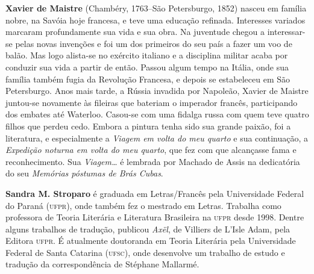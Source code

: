 \textbf{Xavier de Maistre} (Chambéry, 1763--São Petersburgo, 1852)
nasceu em família nobre, na Savóia hoje francesa, e teve uma educação
refinada. Interesses variados marcaram profundamente sua vida e
sua obra. Na juventude chegou a interessar-se pelas novas invenções e
foi um dos primeiros do seu país a fazer um voo de balão. Mas logo
alista-se no exército italiano e a disciplina militar acaba por
conduzir sua vida a partir de então. Passou algum tempo na Itália, onde
sua família também fugia da Revolução Francesa, e depois se estabeleceu
em São Petersburgo. Anos mais tarde, a Rússia invadida por Napoleão,
Xavier de Maistre juntou-se novamente às fileiras que bateriam o
imperador francês, participando dos embates até Waterloo. Casou-se com
uma fidalga russa com quem teve quatro filhos que perdeu cedo. Embora a
pintura tenha sido sua grande paixão, foi a literatura, e especialmente
a \textit{Viagem em volta do meu quarto} e sua continuação, a
\textit{Expedição noturna em volta do meu quarto}, que fez com que
alcançasse fama e reconhecimento. Sua \textit{Viagem\ldots} é lembrada por
Machado de Assis na dedicatória do seu \textit{Memórias póstumas de Brás Cubas}.   

\textbf{Sandra M. Stroparo} é graduada em Letras/Francês pela Universidade
Federal do Paraná (\textsc{ufpr}), onde também fez o mestrado em Letras.
Trabalha como professora de Teoria Literária e Literatura Brasileira na
\textsc{ufpr} desde 1998. Dentre alguns trabalhos de tradução, publicou
\textit{Axël}, de Villiers de L’Isle Adam, pela Editora \textsc{ufpr}. É
atualmente doutoranda em Teoria Literária pela Universidade Federal de
Santa Catarina (\textsc{ufsc}), onde desenvolve um trabalho de estudo e tradução
da correspondência de Stéphane Mallarmé. 



